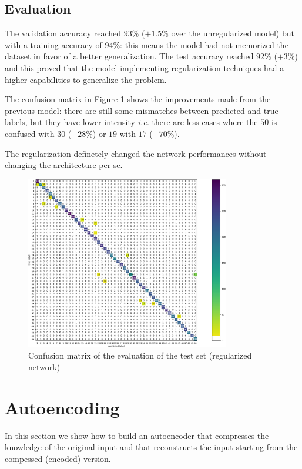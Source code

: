 \documentclass[compsoc]{IEEEtran}
\begin{document}
\subsection{Evaluation}

The validation accuracy reached $93\%$ ($+1.5\%$ over the unregularized model) but with a training accuracy of $94\%$: this means the model had not memorized the dataset
in favor of a better generalization. The test accuracy reached $92\%$ ($+3\%$) and this proved that the model implementing regularization techniques 
had a higher capabilities to generalize the problem. \par
The confusion matrix in Figure \ref{fig:regcm} shows the improvements made from the previous model: there are still some mismatches between predicted and true labels, but they have lower intensity \emph{i.e.} there are less cases where the $50$ is confused with $30$ ($-28\%$) or $19$ with $17$ ($-70\%$).\par
The regularization definetely changed the network performances without changing the architecture per se.

\begin{figure}[ht!]
\centering                                                                        
\includegraphics[width=3.5in]{regcm.png}
\captionsetup{justification=centering}
\caption{Confusion matrix of the evaluation of the test set (regularized network)}
\label{fig:regcm}
\end{figure}


\section{Autoencoding}
In this section we show how to build an autoencoder that compresses the knowledge of the original input and that reconstructs the input starting from the compessed (encoded) version.
\end{document}
